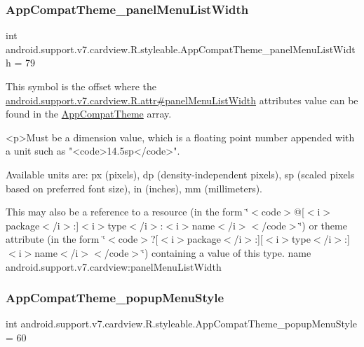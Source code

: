 \subsubsection{\texorpdfstring{App\+Compat\+Theme\+\_\+panel\+Menu\+List\+Width}{AppCompatTheme\_panelMenuListWidth}}
{\footnotesize\ttfamily int android.\+support.\+v7.\+cardview.\+R.\+styleable.\+App\+Compat\+Theme\+\_\+panel\+Menu\+List\+Width = 79\hspace{0.3cm}{\ttfamily [static]}}

This symbol is the offset where the \hyperlink{classandroid_1_1support_1_1v7_1_1cardview_1_1R_1_1attr_a4b602f80daf4caaeaa1f7a222674fff1}{android.\+support.\+v7.\+cardview.\+R.\+attr\#panel\+Menu\+List\+Width} attribute\textquotesingle{}s value can be found in the \hyperlink{classandroid_1_1support_1_1v7_1_1cardview_1_1R_1_1styleable_a52e6f69f954ecc2622d72c0b4d298938}{App\+Compat\+Theme} array.

\begin{DoxyVerb}      <p>Must be a dimension value, which is a floating point number appended with a unit such as "<code>14.5sp</code>".
\end{DoxyVerb}
 Available units are\+: px (pixels), dp (density-\/independent pixels), sp (scaled pixels based on preferred font size), in (inches), mm (millimeters). 

This may also be a reference to a resource (in the form \char`\"{}$<$code$>$@\mbox{[}$<$i$>$package$<$/i$>$\+:\mbox{]}$<$i$>$type$<$/i$>$\+:$<$i$>$name$<$/i$>$$<$/code$>$\char`\"{}) or theme attribute (in the form \char`\"{}$<$code$>$?\mbox{[}$<$i$>$package$<$/i$>$\+:\mbox{]}\mbox{[}$<$i$>$type$<$/i$>$\+:\mbox{]}$<$i$>$name$<$/i$>$$<$/code$>$\char`\"{}) containing a value of this type.  name android.\+support.\+v7.\+cardview\+:panel\+Menu\+List\+Width \mbox{\label{classandroid_1_1support_1_1v7_1_1cardview_1_1R_1_1styleable_a1661ed867614a2bbfea7605ed5b8da7b}} 
\subsubsection{\texorpdfstring{App\+Compat\+Theme\+\_\+popup\+Menu\+Style}{AppCompatTheme\_popupMenuStyle}}
{\footnotesize\ttfamily int android.\+support.\+v7.\+cardview.\+R.\+styleable.\+App\+Compat\+Theme\+\_\+popup\+Menu\+Style = 60\hspace{0.3cm}{\ttfamily [static]}}

